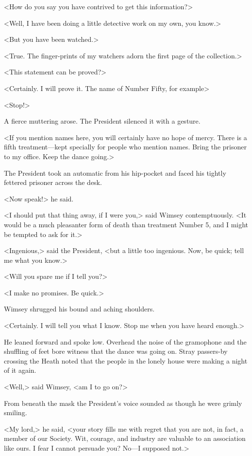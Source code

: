 <How do you say you have contrived to get this information?>

<Well, I have been doing a little detective work on my own, you know.>

<But you have been watched.>

<True. The finger-prints of my watchers adorn the first page of the collection.>

<This statement can be proved?>

<Certainly. I will prove it. The name of Number Fifty, for example\longdash>

<Stop!>

A fierce muttering arose. The President silenced it with a gesture.

<If you mention names here, you will certainly have no hope of mercy. There is a fifth treatment—kept specially for people who mention names. Bring the prisoner to my office. Keep the dance going.>

The President took an automatic from his hip-pocket and faced his tightly fettered prisoner across the desk.

<Now speak!> he said.

<I should put that thing away, if I were you,> said Wimsey contemptuously. <It would be a much pleasanter form of death than treatment Number 5, and I might be tempted to ask for it.>

<Ingenious,> said the President, <but a little too ingenious. Now, be quick; tell me what you know.>

<Will you spare me if I tell you?>

<I make no promises. Be quick.>

Wimsey shrugged his bound and aching shoulders.

<Certainly. I will tell you what I know. Stop me when you have heard enough.>

He leaned forward and spoke low. Overhead the noise of the gramophone and the shuffling of feet bore witness that the dance was going on. Stray passers-by crossing the Heath noted that the people in the lonely house were making a night of it again.

<Well,> said Wimsey, <am I to go on?>

From beneath the mask the President's voice sounded as though he were grimly smiling.

<My lord,> he said, <your story fills me with regret that you are not, in fact, a member of our Society. Wit, courage, and industry are valuable to an association like ours. I fear I cannot persuade you? No—I supposed not.>

